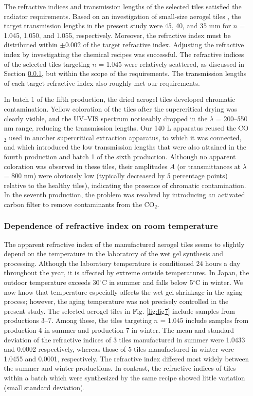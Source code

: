 \documentclass[5p,twocolumn]{elsarticle}
\begin{document}
The refractive indices and transmission lengths of the selected tiles satisfied the radiator requirements. Based on an investigation of small-size aerogel tiles \cite{cite2,cite10}, the target transmission lengths in the present study were 45, 40, and 35 mm for $n$ = 1.045, 1.050, and 1.055, respectively. Moreover, the refractive index must be distributed within $\pm $0.002 of the target refractive index. Adjusting the refractive index by investigating the chemical recipes was successful. The refractive indices of the selected tiles targeting $n$ = 1.045 were relatively scattered, as discussed in Section \ref{5-2-2}, but within the scope of the requirements. The transmission lengths of each target refractive index also roughly met our requirements.

In batch 1 of the fifth production, the dried aerogel tiles developed chromatic contamination. Yellow coloration of the tiles after the supercritical drying was clearly visible, and the UV--VIS spectrum noticeably dropped in the $\lambda $ = 200--550 nm range, reducing the transmission lengths. Our 140 L apparatus reused the CO$_2$ used in another supercritical extraction apparatus, to which it was connected, and which introduced the low transmission lengths that were also attained in the fourth production and batch 1 of the sixth production. Although no apparent coloration was observed in these tiles, their amplitudes $A$ (or transmittances at $\lambda $ = 800 nm) were obviously low (typically decreased by 5 percentage points) relative to the healthy tiles), indicating the presence of chromatic contamination. In the seventh production, the problem was resolved by introducing an activated carbon filter to remove contaminants from the CO$_2$.

\subsubsection{Dependence of refractive index on room temperature}
\label{5-2-2}

The apparent refractive index of the manufactured aerogel tiles seems to slightly depend on the temperature in the laboratory of the wet gel synthesis and processing. Although the laboratory temperature is conditioned 24 hours a day throughout the year, it is affected by extreme outside temperatures. In Japan, the outdoor temperature exceeds 30$^{\circ }$C in summer and falls below 5$^{\circ }$C in winter. We now know that temperature especially affects the wet gel shrinkage in the aging process; however, the aging temperature was not precisely controlled in the present study. The selected aerogel tiles in Fig. \ref{fig:fig7} include samples from productions 3--7. Among these, the tiles targeting $n$ = 1.045 include samples from production 4 in summer and production 7 in winter. The mean and standard deviation of the refractive indices of 3 tiles manufactured in summer were 1.0433 and 0.0002 respectively, whereas those of 5 tiles manufactured in winter were 1.0455 and 0.0001, respectively. The refractive index differed most widely between the summer and winter productions. In contrast, the refractive indices of tiles within a batch which were synthesized by the same recipe showed little variation (small standard deviation). 
\end{document}
